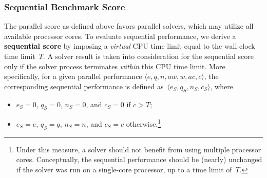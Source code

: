 \documentclass[12pt]{article}
\begin{document}
\subsubsection{Sequential Benchmark Score}
\label{sec:sequential}

The parallel score as defined above favors parallel solvers, which may utilize
all available processor cores.  To evaluate sequential performance, we derive a
\textbf{sequential score} by imposing a \emph{virtual} CPU time limit equal to
the wall-clock time limit~$T$.  A solver result is taken into consideration for
the sequential score only if the solver process terminates \emph{within} this
CPU time limit.  More specifically, for a given parallel performance $\langle
e, q, n, \mathit{aw}, w, \mathit{ac}, c\rangle$, the corresponding sequential performance is defined
as~$\langle e_S, q_S, n_S, c_S\rangle$, where
\begin{itemize}
\item $e_S = 0$, $q_S = 0$, $n_S = 0$, and $c_S = 0$ if $c > T$;
\item $e_S = e$, $q_S = q$, $n_S = n$, and $c_S = c$
  otherwise.\footnote{Under this
  measure, a solver should not benefit from using multiple processor
  cores.  Conceptually, the sequential performance should be (nearly)
  unchanged if the solver was run on a single-core processor, up to a
  time limit of~$T$.}
\end{itemize}
\end{document}
